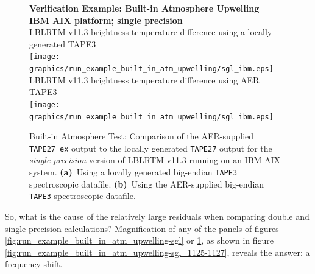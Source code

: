 \begin{figure}[htp]
  \centering
  \qquad\sffamily\textbf{Verification Example: Built-in Atmosphere Upwelling}\\
  \qquad\sffamily\textbf{IBM AIX platform; single precision}\\
  \qquad\textsf{LBLRTM v11.3 brightness temperature difference using a locally generated TAPE3}\\
  \texttt{[image: graphics/run\_example\_built\_in\_atm\_upwelling/sgl\_ibm.eps]}
  \qquad\textsf{LBLRTM v11.3 brightness temperature difference using AER TAPE3}\\
  \texttt{[image: graphics/run\_example\_built\_in\_atm\_upwelling/sgl\_ibm.eps]}
  \caption{Built-in Atmosphere Test: Comparison of the AER-supplied \texttt{TAPE27\_ex} output to the locally generated \texttt{TAPE27} output for the \textsl{single precision} version of LBLRTM v11.3 running on an IBM AIX system. \mbox{\textbf{(a)} Using} a locally generated big-endian \texttt{TAPE3} spectroscopic datafile. \mbox{\textbf{(b)} Using} the AER-supplied big-endian \texttt{TAPE3} spectroscopic datafile.}
  \label{fig:run_example_built_in_atm_upwelling-sgl_ibm}
\end{figure}

So, what is the cause of the relatively large residuals when comparing double and single precision calculations? Magnification of any of the panels of figures \ref{fig:run_example_built_in_atm_upwelling-sgl} or \ref{fig:run_example_built_in_atm_upwelling-sgl_ibm}, as shown in figure \ref{fig:run_example_built_in_atm_upwelling-sgl_1125-1127}, reveals the answer: a frequency shift.

